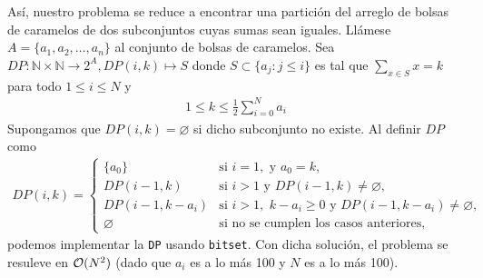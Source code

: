 \documentclass{article}
\newcommand{\N}{\mathbb{N}}
\begin{document}
\begin{enumerate}[label=\textbf{Problema \arabic*}]
        Así, nuestro problema se reduce a encontrar una partición del arreglo de bolsas de caramelos de dos subconjuntos cuyas sumas sean iguales. Llámese $A =\{a_1,a_2,\dots,a_n\}$ al conjunto de bolsas de caramelos. Sea $DP : \N\times\N \to 2^A, DP(i, k) \mapsto S$ donde $S \subset \{a_j : j \leq i\}$ es tal que $\sum_{x \in S} x = k$ para todo $1 \leq i \leq N$ y
        \begin{align*}
            1 \leq k \leq \frac{1}{2}\sum_{i=0}^N a_i
        \end{align*}
        Supongamos que $DP(i, k) = \varnothing$ si dicho subconjunto no existe. Al definir $DP$ como
        \begin{align*}
            DP(i, k) =
            \begin{cases}
                \{a_0\} &\text{si } i = 1,\,\,\text{y}\,\,a_0 = k,\\
                DP(i-1, k) &\text{si }i > 1\text{ y }DP(i-1,k) \neq \varnothing,\\
                DP(i-1, k-a_i) &\text{si }i > 1,\,\,k-a_i \geq 0\,\,\text{y}\,\,DP(i-1,k-a_i) \neq \varnothing,\\
                \varnothing &\text{si no se cumplen los casos anteriores,}
            \end{cases}
        \end{align*}
        podemos implementar la \texttt{DP} usando \texttt{bitset}. Con dicha solución, el problema se resuleve en ${\cal O}(N^2)$ (dado que $a_i$ es a lo más 100 y $N$ es a lo más 100).
    \end{enumerate}
\end{document}
